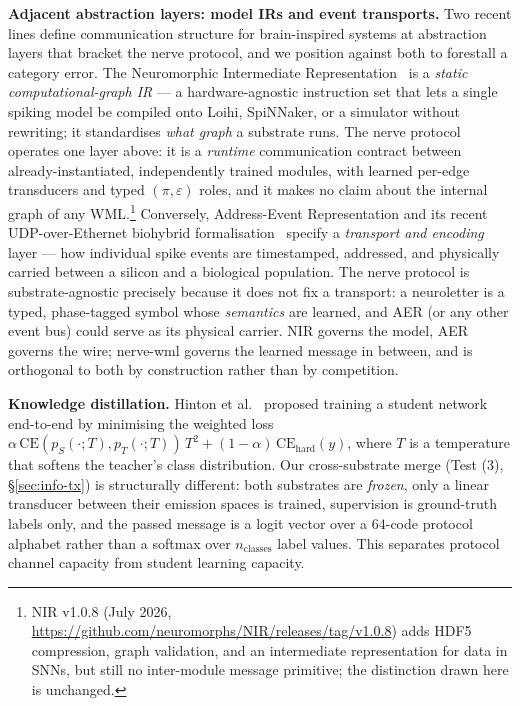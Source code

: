 \documentclass[10pt,twocolumn]{article}
\begin{document}
\textbf{Adjacent abstraction layers: model IRs and event transports.}
Two recent lines define communication structure for brain-inspired
systems at abstraction layers that bracket the nerve protocol, and we
position against both to forestall a category error. The Neuromorphic
Intermediate Representation~\cite{pedersen2024nir} is a
\emph{static computational-graph IR} --- a hardware-agnostic instruction
set that lets a single spiking model be compiled onto Loihi, SpiNNaker,
or a simulator without rewriting; it standardises \emph{what graph} a
substrate runs. The nerve protocol operates one layer above: it is a
\emph{runtime} communication contract between already-instantiated,
independently trained modules, with learned per-edge transducers and
typed $(\pi, \varepsilon)$ roles, and it makes no claim about the
internal graph of any WML.\footnote{NIR v1.0.8 (July 2026,
\url{https://github.com/neuromorphs/NIR/releases/tag/v1.0.8}) adds HDF5
compression, graph validation, and an intermediate representation for
data in SNNs, but still no inter-module message primitive; the
distinction drawn here is unchanged.} Conversely, Address-Event Representation and
its recent UDP-over-Ethernet biohybrid formalisation~\cite{aer2025biohybrid}
specify a \emph{transport and encoding} layer --- how individual spike
events are timestamped, addressed, and physically carried between a
silicon and a biological population. The nerve protocol is
substrate-agnostic precisely because it does not fix a transport: a
neuroletter is a typed, phase-tagged symbol whose \emph{semantics} are
learned, and AER (or any other event bus) could serve as its physical
carrier. NIR governs the model, AER governs the wire; nerve-wml
governs the learned message in between, and is orthogonal to both by
construction rather than by competition.

\textbf{Knowledge distillation.} Hinton et al.~\cite{hinton2015distilling} proposed training a student network end-to-end by minimising the weighted loss $\alpha\,\mathrm{CE}(p_S(\cdot; T), p_T(\cdot; T))\,T^2 + (1-\alpha)\,\mathrm{CE}_{\mathrm{hard}}(y)$, where $T$ is a temperature that softens the teacher's class distribution. Our cross-substrate merge (Test (3), \S\ref{sec:info-tx}) is structurally different: both substrates are \emph{frozen}, only a linear transducer between their emission spaces is trained, supervision is ground-truth labels only, and the passed message is a logit vector over a $64$-code protocol alphabet rather than a softmax over $n_{\mathrm{classes}}$ label values. This separates protocol channel capacity from student learning capacity.
\end{document}
